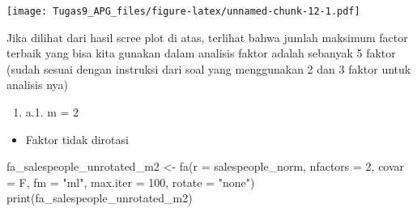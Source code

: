 \documentclass[
]{article}
\newenvironment{Shaded}{\begin{snugshade}}{\end{snugshade}}
\newcommand{\AttributeTok}[1]{\textcolor[rgb]{0.77,0.63,0.00}{#1}}
\newcommand{\DecValTok}[1]{\textcolor[rgb]{0.00,0.00,0.81}{#1}}
\newcommand{\FunctionTok}[1]{\textcolor[rgb]{0.00,0.00,0.00}{#1}}
\newcommand{\NormalTok}[1]{#1}
\newcommand{\OtherTok}[1]{\textcolor[rgb]{0.56,0.35,0.01}{#1}}
\newcommand{\SpecialCharTok}[1]{\textcolor[rgb]{0.00,0.00,0.00}{#1}}
\newcommand{\StringTok}[1]{\textcolor[rgb]{0.31,0.60,0.02}{#1}}
\providecommand{\tightlist}{%
  \setlength{\itemsep}{0pt}\setlength{\parskip}{0pt}}
\begin{document}
\begin{Shaded}
\end{Shaded}

\texttt{[image: Tugas9\_APG\_files/figure-latex/unnamed-chunk-12-1.pdf]}

Jika dilihat dari hasil scree plot di atas, terlihat bahwa jumlah
maksimum factor terbaik yang bisa kita gunakan dalam analisis faktor
adalah sebanyak 5 faktor (sudah sesuai dengan instruksi dari soal yang
menggunakan 2 dan 3 faktor untuk analisis nya)

\begin{enumerate}
\def\labelenumi{\alph{enumi}.}
\tightlist
\item
  a.1. m = 2
\end{enumerate}

\begin{itemize}
\tightlist
\item
  Faktor tidak dirotasi
\end{itemize}

\begin{Shaded}
\begin{Highlighting}[]
\NormalTok{fa\_salespeople\_unrotated\_m2 }\OtherTok{\textless{}{-}} \FunctionTok{fa}\NormalTok{(}\AttributeTok{r =}\NormalTok{ salespeople\_norm, }\AttributeTok{nfactors =} \DecValTok{2}\NormalTok{, }\AttributeTok{covar =}\NormalTok{ F, }\AttributeTok{fm =} \StringTok{"ml"}\NormalTok{, }\AttributeTok{max.iter =} \DecValTok{100}\NormalTok{, }\AttributeTok{rotate =} \StringTok{"none"}\NormalTok{)}
\FunctionTok{print}\NormalTok{(fa\_salespeople\_unrotated\_m2)}
\end{Highlighting}
\end{Shaded}
\end{document}
